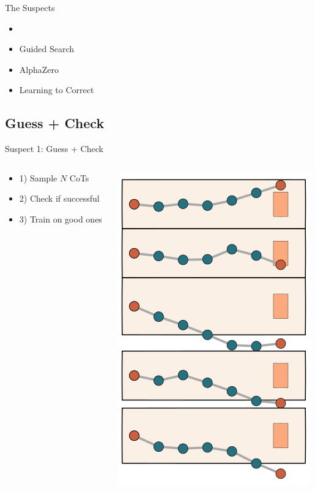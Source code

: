 \documentclass[14pt,aspectratio=169]{beamer}
\begin{document}
\begin{frame}{The Suspects}
	\begin{itemize}
		\item {}
		\item Guided Search
		\item AlphaZero
		\item Learning to Correct
	\end{itemize}
\end{frame}

\subsection{Guess + Check}

\begin{frame}{Suspect 1: Guess + Check}
	\begin{columns}
		\begin{column}{0.5\linewidth}
			\begin{itemize}
				\item 1) Sample $N$ CoTs
				\item 2) Check if successful
				\item 3) Train on good ones
			\end{itemize}
		\end{column}
		\begin{column}{0.5\linewidth}
			\begin{center}
				\includegraphics[height=0.8\textheight]{images/reject1}
			\end{center}
		\end{column}
	\end{columns}
\end{frame}
\end{document}
